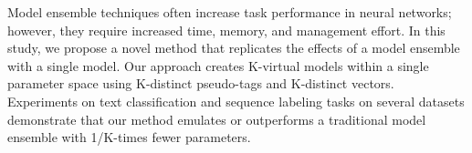 Model ensemble techniques often increase task performance in neural networks; however, they require increased time, memory, and management effort. In this study, we propose a novel method that replicates the effects of a model ensemble with a single model. Our approach creates K-virtual models within a single parameter space using K-distinct pseudo-tags and K-distinct vectors. Experiments on text classification and sequence labeling tasks on several datasets demonstrate that our method emulates or outperforms a traditional model ensemble with 1/K-times fewer parameters.
